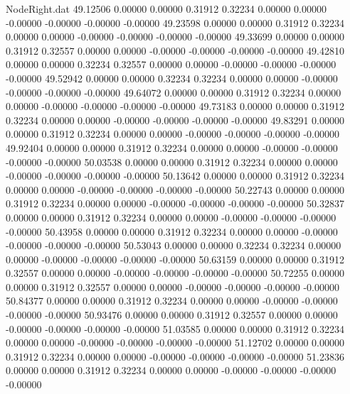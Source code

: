 \begin{filecontents}{NodeRight.dat}
  49.12506    0.00000    0.00000     0.31912    0.32234    0.00000    0.00000   -0.00000   -0.00000   -0.00000   -0.00000
  49.23598    0.00000    0.00000     0.31912    0.32234    0.00000    0.00000   -0.00000   -0.00000   -0.00000   -0.00000
  49.33699    0.00000    0.00000     0.31912    0.32557    0.00000    0.00000   -0.00000   -0.00000   -0.00000   -0.00000
  49.42810    0.00000    0.00000     0.32234    0.32557    0.00000    0.00000   -0.00000   -0.00000   -0.00000   -0.00000
  49.52942    0.00000    0.00000     0.32234    0.32234    0.00000    0.00000   -0.00000   -0.00000   -0.00000   -0.00000
  49.64072    0.00000    0.00000     0.31912    0.32234    0.00000    0.00000   -0.00000   -0.00000   -0.00000   -0.00000
  49.73183    0.00000    0.00000     0.31912    0.32234    0.00000    0.00000   -0.00000   -0.00000   -0.00000   -0.00000
  49.83291    0.00000    0.00000     0.31912    0.32234    0.00000    0.00000   -0.00000   -0.00000   -0.00000   -0.00000
  49.92404    0.00000    0.00000     0.31912    0.32234    0.00000    0.00000   -0.00000   -0.00000   -0.00000   -0.00000
  50.03538    0.00000    0.00000     0.31912    0.32234    0.00000    0.00000   -0.00000   -0.00000   -0.00000   -0.00000
  50.13642    0.00000    0.00000     0.31912    0.32234    0.00000    0.00000   -0.00000   -0.00000   -0.00000   -0.00000
  50.22743    0.00000    0.00000     0.31912    0.32234    0.00000    0.00000   -0.00000   -0.00000   -0.00000   -0.00000
  50.32837    0.00000    0.00000     0.31912    0.32234    0.00000    0.00000   -0.00000   -0.00000   -0.00000   -0.00000
  50.43958    0.00000    0.00000     0.31912    0.32234    0.00000    0.00000   -0.00000   -0.00000   -0.00000   -0.00000
  50.53043    0.00000    0.00000     0.32234    0.32234    0.00000    0.00000   -0.00000   -0.00000   -0.00000   -0.00000
  50.63159    0.00000    0.00000     0.31912    0.32557    0.00000    0.00000   -0.00000   -0.00000   -0.00000   -0.00000
  50.72255    0.00000    0.00000     0.31912    0.32557    0.00000    0.00000   -0.00000   -0.00000   -0.00000   -0.00000
  50.84377    0.00000    0.00000     0.31912    0.32234    0.00000    0.00000   -0.00000   -0.00000   -0.00000   -0.00000
  50.93476    0.00000    0.00000     0.31912    0.32557    0.00000    0.00000   -0.00000   -0.00000   -0.00000   -0.00000
  51.03585    0.00000    0.00000     0.31912    0.32234    0.00000    0.00000   -0.00000   -0.00000   -0.00000   -0.00000
  51.12702    0.00000    0.00000     0.31912    0.32234    0.00000    0.00000   -0.00000   -0.00000   -0.00000   -0.00000
  51.23836    0.00000    0.00000     0.31912    0.32234    0.00000    0.00000   -0.00000   -0.00000   -0.00000   -0.00000

\end{filecontents}
